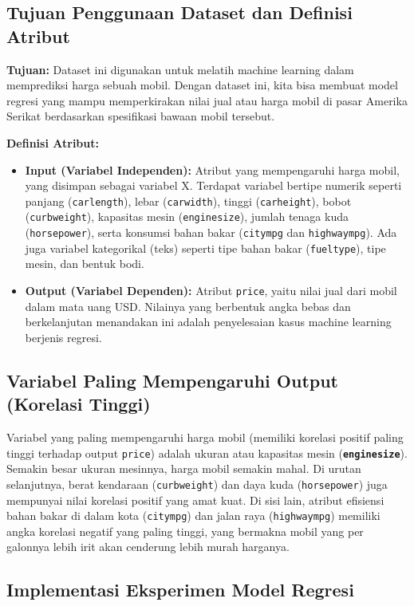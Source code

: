 \documentclass[a4paper,oneside,11pt]{book}
\begin{document}
\subsection{Tujuan Penggunaan Dataset dan Definisi Atribut}
\textbf{Tujuan:} Dataset ini digunakan untuk melatih machine learning dalam memprediksi harga sebuah mobil. Dengan dataset ini, kita bisa membuat model regresi yang mampu memperkirakan nilai jual atau harga mobil di pasar Amerika Serikat berdasarkan spesifikasi bawaan mobil tersebut.

\textbf{Definisi Atribut:}
\begin{itemize}
    \item \textbf{Input (Variabel Independen):} Atribut yang mempengaruhi harga mobil, yang disimpan sebagai variabel X. Terdapat variabel bertipe numerik seperti panjang (\texttt{carlength}), lebar (\texttt{carwidth}), tinggi (\texttt{carheight}), bobot (\texttt{curbweight}), kapasitas mesin (\texttt{enginesize}), jumlah tenaga kuda (\texttt{horsepower}), serta konsumsi bahan bakar (\texttt{citympg} dan \texttt{highwaympg}). Ada juga variabel kategorikal (teks) seperti tipe bahan bakar (\texttt{fueltype}), tipe mesin, dan bentuk bodi.
    \item \textbf{Output (Variabel Dependen):} Atribut \texttt{price}, yaitu nilai jual dari mobil dalam mata uang USD. Nilainya yang berbentuk angka bebas dan berkelanjutan menandakan ini adalah penyelesaian kasus machine learning berjenis regresi.
\end{itemize}

\subsection{Variabel Paling Mempengaruhi Output (Korelasi Tinggi)}
Variabel yang paling mempengaruhi harga mobil (memiliki korelasi positif paling tinggi terhadap output \texttt{price}) adalah ukuran atau kapasitas mesin (\textbf{\texttt{enginesize}}). Semakin besar ukuran mesinnya, harga mobil semakin mahal. Di urutan selanjutnya, berat kendaraan (\texttt{curbweight}) dan daya kuda (\texttt{horsepower}) juga mempunyai nilai korelasi positif yang amat kuat.
Di sisi lain, atribut efisiensi bahan bakar di dalam kota (\texttt{citympg}) dan jalan raya (\texttt{highwaympg}) memiliki angka korelasi negatif yang paling tinggi, yang bermakna mobil yang per galonnya lebih irit akan cenderung lebih murah harganya.

\subsection{Implementasi Eksperimen Model Regresi}
\end{document}
